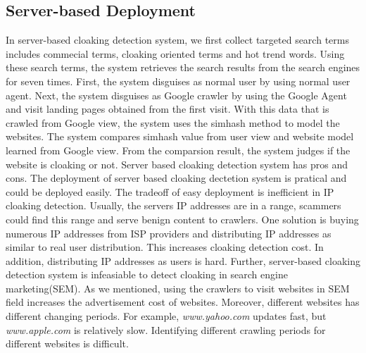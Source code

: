 \subsection{Server-based Deployment}
In server-based cloaking detection system,
we first collect targeted search terms includes commecial terms, cloaking oriented terms and hot trend words.
Using these search terms, the system retrieves the search results from the search engines for seven times.
First, the system disguises as normal user by using normal user agent. Next, the
system disguises as Google crawler by using the Google Agent and visit landing
pages obtained from the first visit. With this data that
is crawled from Google view, the system uses the simhash method to model the websites.  
The system compares simhash value from user view and
website model learned from Google view. From the comparsion result, the system judges if the website is cloaking
or not. 
Server based cloaking detection system has pros and cons. The deployment of server based cloaking dectetion system
is pratical and could be deployed
easily. The tradeoff of easy deployment is inefficient in IP cloaking detection. Usually, the servers IP addresses
are in a range,  scammers could find this range and serve benign content to crawlers. One solution is buying numerous IP addresses
from ISP providers and distributing IP addresses as similar to real user distribution. This increases cloaking detection cost. In
addition, distributing IP addresses as users is hard. Further, server-based cloaking detection system is infeasiable
to detect cloaking in search engine marketing(SEM). As we mentioned, using the crawlers to visit websites in SEM field
increases the advertisement cost of websites. Moreover, different websites has
different changing periods. For example, {\it www.yahoo.com} 
updates fast, but {\it www.apple.com} is relatively slow. Identifying different 
crawling periods for different websites is difficult. 

